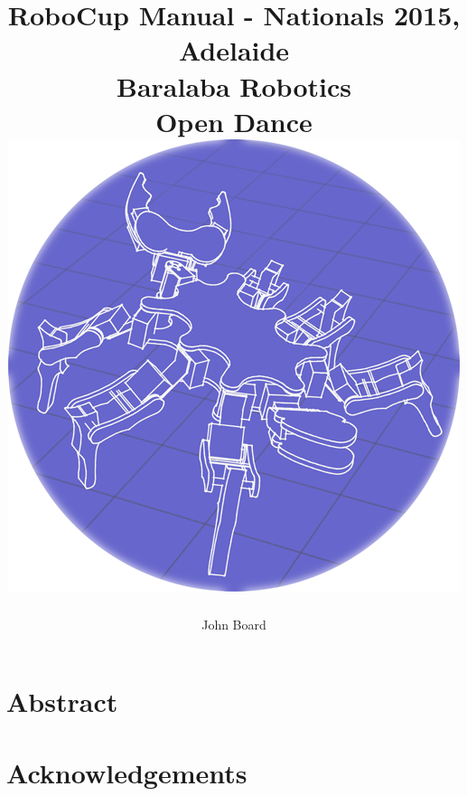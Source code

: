 \documentclass[12pt]{report}
\begin{document}
    \begin{titlepage}
        \title{
            {RoboCup Manual - Nationals 2015, Adelaide}\\
            {\large Baralaba Robotics}\\
            {\large Open Dance}\\
            [1.25cm]
            {\includegraphics[width=0.5\linewidth]{images/Feathering.png}}
        }
        \author{John Board}
        \maketitle
    \end{titlepage}
    
    
    
    \setcounter{page}{1}
    
    \chapter*{Abstract}
        
    
    \chapter*{Acknowledgements}
        
    
    
    \tableofcontents
    \pagebreak
    
    
\end{document}
